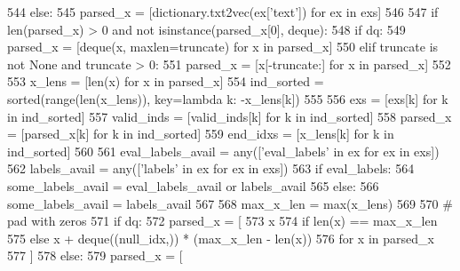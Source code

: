 \begin{DoxyCode}
544         \textcolor{keywordflow}{else}:
545             parsed\_x = [dictionary.txt2vec(ex[\textcolor{stringliteral}{'text'}]) \textcolor{keywordflow}{for} ex \textcolor{keywordflow}{in} exs]
546 
547         \textcolor{keywordflow}{if} len(parsed\_x) > 0 \textcolor{keywordflow}{and} \textcolor{keywordflow}{not} isinstance(parsed\_x[0], deque):
548             \textcolor{keywordflow}{if} dq:
549                 parsed\_x = [deque(x, maxlen=truncate) \textcolor{keywordflow}{for} x \textcolor{keywordflow}{in} parsed\_x]
550             \textcolor{keywordflow}{elif} truncate \textcolor{keywordflow}{is} \textcolor{keywordflow}{not} \textcolor{keywordtype}{None} \textcolor{keywordflow}{and} truncate > 0:
551                 parsed\_x = [x[-truncate:] \textcolor{keywordflow}{for} x \textcolor{keywordflow}{in} parsed\_x]
552 
553         x\_lens = [len(x) \textcolor{keywordflow}{for} x \textcolor{keywordflow}{in} parsed\_x]
554         ind\_sorted = sorted(range(len(x\_lens)), key=\textcolor{keyword}{lambda} k: -x\_lens[k])
555 
556         exs = [exs[k] \textcolor{keywordflow}{for} k \textcolor{keywordflow}{in} ind\_sorted]
557         valid\_inds = [valid\_inds[k] \textcolor{keywordflow}{for} k \textcolor{keywordflow}{in} ind\_sorted]
558         parsed\_x = [parsed\_x[k] \textcolor{keywordflow}{for} k \textcolor{keywordflow}{in} ind\_sorted]
559         end\_idxs = [x\_lens[k] \textcolor{keywordflow}{for} k \textcolor{keywordflow}{in} ind\_sorted]
560 
561         eval\_labels\_avail = any([\textcolor{stringliteral}{'eval\_labels'} \textcolor{keywordflow}{in} ex \textcolor{keywordflow}{for} ex \textcolor{keywordflow}{in} exs])
562         labels\_avail = any([\textcolor{stringliteral}{'labels'} \textcolor{keywordflow}{in} ex \textcolor{keywordflow}{for} ex \textcolor{keywordflow}{in} exs])
563         \textcolor{keywordflow}{if} eval\_labels:
564             some\_labels\_avail = eval\_labels\_avail \textcolor{keywordflow}{or} labels\_avail
565         \textcolor{keywordflow}{else}:
566             some\_labels\_avail = labels\_avail
567 
568         max\_x\_len = max(x\_lens)
569 
570         \textcolor{comment}{# pad with zeros}
571         \textcolor{keywordflow}{if} dq:
572             parsed\_x = [
573                 x
574                 \textcolor{keywordflow}{if} len(x) == max\_x\_len
575                 \textcolor{keywordflow}{else} x + deque((null\_idx,)) * (max\_x\_len - len(x))
576                 \textcolor{keywordflow}{for} x \textcolor{keywordflow}{in} parsed\_x
577             ]
578         \textcolor{keywordflow}{else}:
579             parsed\_x = [

\end{DoxyCode}
